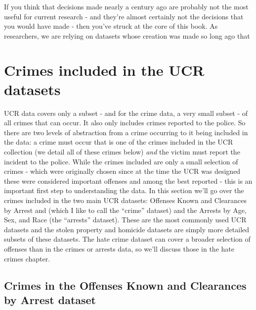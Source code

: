 \documentclass[
  12pt,
  openany]{book}
\begin{document}
If you think that decisions made nearly a century ago are probably not the most useful for current research - and they're almost certainly not the decisions that you would have made - then you've struck at the core of this book. As researchers, we are relying on datasets whose creation was made so long ago that

\hypertarget{crimes-included-in-the-ucr-datasets}{%
\section{Crimes included in the UCR datasets}\label{crimes-included-in-the-ucr-datasets}}

UCR data covers only a subset - and for the crime data, a very small subset - of all crimes that can occur. It also only includes crimes reported to the police. So there are two levels of abstraction from a crime occurring to it being included in the data: a crime must occur that is one of the crimes included in the UCR collection (we detail all of these crimes below) \emph{and} the victim must report the incident to the police. While the crimes included are only a small selection of crimes - which were originally chosen since at the time the UCR was designed these were considered important offenses and among the best reported - this is an important first step to understanding the data. In this section we'll go over the crimes included in the two main UCR datasets: Offenses Known and Clearances by Arrest and (which I like to call the ``crime'' dataset) and the Arrests by Age, Sex, and Race (the ``arrests'' dataset). These are the most commonly used UCR datasets and the stolen property and homicide datasets are simply more detailed subsets of these datasets. The hate crime dataset can cover a broader selection of offenses than in the crimes or arrests data, so we'll discuss those in the hate crimes chapter.

\hypertarget{crimes-in-the-offenses-known-and-clearances-by-arrest-dataset}{%
\subsection{Crimes in the Offenses Known and Clearances by Arrest dataset}\label{crimes-in-the-offenses-known-and-clearances-by-arrest-dataset}}
\end{document}
